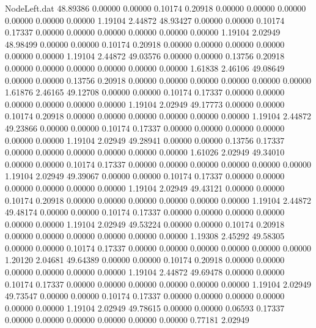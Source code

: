 \begin{filecontents}{NodeLeft.dat}
  48.89386    0.00000    0.00000     0.10174    0.20918    0.00000    0.00000    0.00000    0.00000    0.00000    0.00000    1.19104    2.44872
  48.93427    0.00000    0.00000     0.10174    0.17337    0.00000    0.00000    0.00000    0.00000    0.00000    0.00000    1.19104    2.02949
  48.98499    0.00000    0.00000     0.10174    0.20918    0.00000    0.00000    0.00000    0.00000    0.00000    0.00000    1.19104    2.44872
  49.03576    0.00000    0.00000     0.13756    0.20918    0.00000    0.00000    0.00000    0.00000    0.00000    0.00000    1.61838    2.46106
  49.08649    0.00000    0.00000     0.13756    0.20918    0.00000    0.00000    0.00000    0.00000    0.00000    0.00000    1.61876    2.46165
  49.12708    0.00000    0.00000     0.10174    0.17337    0.00000    0.00000    0.00000    0.00000    0.00000    0.00000    1.19104    2.02949
  49.17773    0.00000    0.00000     0.10174    0.20918    0.00000    0.00000    0.00000    0.00000    0.00000    0.00000    1.19104    2.44872
  49.23866    0.00000    0.00000     0.10174    0.17337    0.00000    0.00000    0.00000    0.00000    0.00000    0.00000    1.19104    2.02949
  49.28941    0.00000    0.00000     0.13756    0.17337    0.00000    0.00000    0.00000    0.00000    0.00000    0.00000    1.61026    2.02949
  49.34010    0.00000    0.00000     0.10174    0.17337    0.00000    0.00000    0.00000    0.00000    0.00000    0.00000    1.19104    2.02949
  49.39067    0.00000    0.00000     0.10174    0.17337    0.00000    0.00000    0.00000    0.00000    0.00000    0.00000    1.19104    2.02949
  49.43121    0.00000    0.00000     0.10174    0.20918    0.00000    0.00000    0.00000    0.00000    0.00000    0.00000    1.19104    2.44872
  49.48174    0.00000    0.00000     0.10174    0.17337    0.00000    0.00000    0.00000    0.00000    0.00000    0.00000    1.19104    2.02949
  49.53224    0.00000    0.00000     0.10174    0.20918    0.00000    0.00000    0.00000    0.00000    0.00000    0.00000    1.19308    2.45292
  49.58305    0.00000    0.00000     0.10174    0.17337    0.00000    0.00000    0.00000    0.00000    0.00000    0.00000    1.20120    2.04681
  49.64389    0.00000    0.00000     0.10174    0.20918    0.00000    0.00000    0.00000    0.00000    0.00000    0.00000    1.19104    2.44872
  49.69478    0.00000    0.00000     0.10174    0.17337    0.00000    0.00000    0.00000    0.00000    0.00000    0.00000    1.19104    2.02949
  49.73547    0.00000    0.00000     0.10174    0.17337    0.00000    0.00000    0.00000    0.00000    0.00000    0.00000    1.19104    2.02949
  49.78615    0.00000    0.00000     0.06593    0.17337    0.00000    0.00000    0.00000    0.00000    0.00000    0.00000    0.77181    2.02949

\end{filecontents}
